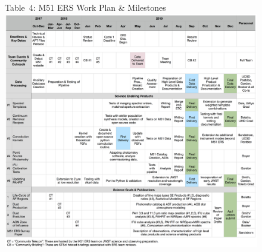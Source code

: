 \documentclass[12pt]{article}
\begin{document}
\vspace{-0.1in}
\begin{figure}[h!]
\begin{center}
Table~4: M51 ERS Work Plan \& Milestones
\includegraphics[width=\textwidth]{workplan_crop_new.png} 
\label{tab:workplan}
\vspace{-0.3in}
\end{center}
\end{figure}



\end{document}
